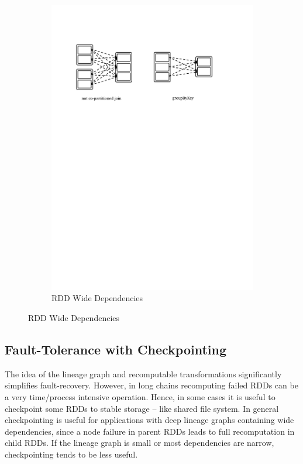 \begin{figure}[!htbp]
\begin{subfigure}[b]{\linewidth}
        \includegraphics[clip,trim=2cm 19.5cm 3.5cm 4cm,scale=0.9]{wide-dep.pdf}
        \caption[RDD Wide Dependencies]{RDD Wide Dependencies\footnotemark[\value{footnote}]}
        \label{fig:sp:wide-dep}
    \end{subfigure}
\end{figure}
\subsection{Fault-Tolerance with Checkpointing}
\label{sp:fault}
The idea of the lineage graph and recomputable transformations significantly simplifies fault-recovery. However, in long chains recomputing failed RDDs can be a very time/process intensive operation. Hence, in some cases it is useful to checkpoint some RDDs to stable storage -- like shared file system. In general checkpointing is useful for applications with deep lineage graphs containing wide dependencies, since a node failure in parent RDDs leads to full recomputation in child RDDs. If the lineage graph is small or most dependencies are narrow, checkpointing tends to be less useful. 

